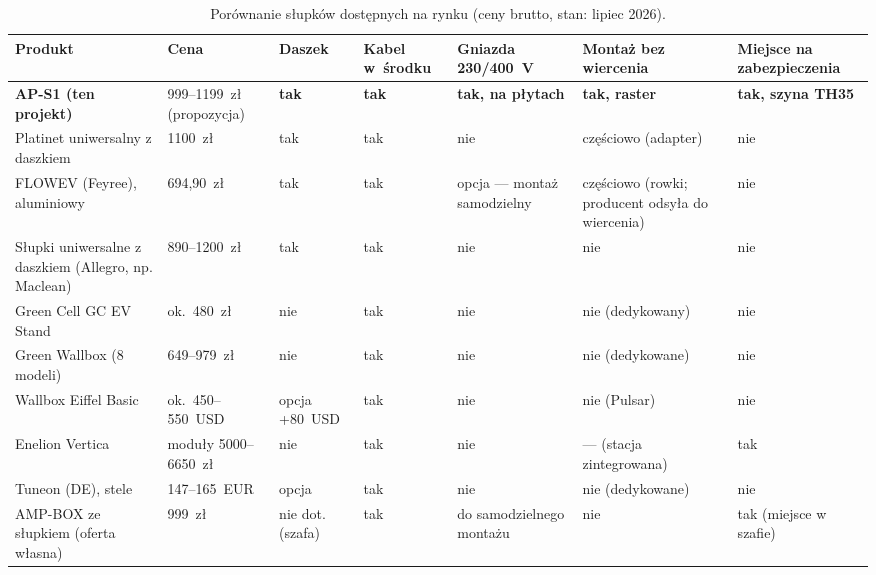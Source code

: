 \documentclass[11pt,a4paper]{article}
\begin{document}
\begin{table}[h]\small
\caption{Porównanie słupków dostępnych na rynku (ceny brutto, stan: lipiec 2026).}
\label{tab:konkurencja}
\begin{tabular}{p{3.4cm}p{1.9cm}p{1.2cm}p{1.6cm}p{2.0cm}p{1.8cm}p{2.2cm}}
\toprule
Produkt & Cena & Daszek & Kabel w~środku & Gniazda 230/400~V & Montaż bez wiercenia & Miejsce na zabezpieczenia\\
\midrule
\textbf{AP-S1 (ten projekt)} & 999--1199~zł (propozycja) & \textbf{tak} & \textbf{tak} & \textbf{tak, na płytach} & \textbf{tak, raster} & \textbf{tak, szyna TH35}\\
Platinet uniwersalny z daszkiem & 1100~zł & tak & tak & nie & częściowo (adapter) & nie\\
FLOWEV (Feyree), aluminiowy & 694,90~zł & tak & tak & opcja --- montaż samodzielny & częściowo (rowki; producent odsyła do wiercenia) & nie\\
Słupki uniwersalne z daszkiem (Allegro, np. Maclean) & 890--1200~zł & tak & tak & nie & nie & nie\\
Green Cell GC EV Stand & ok.~480~zł & nie & tak & nie & nie (dedykowany) & nie\\
Green Wallbox (8 modeli) & 649--979~zł & nie & tak & nie & nie (dedykowane) & nie\\
Wallbox Eiffel Basic & ok.~450--550~USD & opcja +80~USD & tak & nie & nie (Pulsar) & nie\\
Enelion Vertica & moduły 5000--6650~zł & nie & tak & nie & --- (stacja zintegrowana) & tak\\
Tuneon (DE), stele & 147--165~EUR & opcja & tak & nie & nie (dedykowane) & nie\\
AMP-BOX ze słupkiem (oferta własna) & 999~zł & nie dot. (szafa) & tak & do samodzielnego montażu & nie & tak (miejsce w szafie)\\
\bottomrule
\end{tabular}
\end{table}
\end{document}
